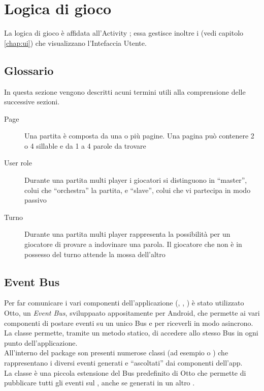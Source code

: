 


\section{Logica di gioco}

\label{chap:game_logic}

La logica di gioco è affidata all'Activity ; essa gestisce inoltre i  (vedi capitolo \ref{chap:ui}) che visualizzano l'Intefaccia Utente.

\subsection{Glossario}
\label{sec:glossary}
In questa sezione vengono descritti acuni termini utili alla comprensione delle successive sezioni.

\begin{description}
\item[Page] Una partita è composta da una o più pagine. Una pagina può contenere 2 o 4 sillable e da 1 a 4 parole da trovare
\item[User role] Durante una partita multi player i giocatori si distinguono in ``master'', colui che ``orchestra'' la partita, e ``slave'', colui che vi partecipa in modo passivo 
\item[Turno] Durante una partita multi player rappresenta la possibilità per un giocatore di provare a indovinare una parola. Il giocatore che non è in possesso del turno attende la mossa dell'altro
\end{description}

\subsection{Event Bus}
\label{sec:event_bus}
Per far comunicare i vari componenti dell'applicazione (, , ) è stato utilizzato Otto, un \textit{Event Bus}, sviluppaato appositamente per Android, che permette ai vari componenti di postare eventi su un unico Bus e per riceverli in modo asincrono.\\
La classe  permette, tramite un metodo statico, di accedere allo stesso Bus in ogni punto dell'applicazione.\\
All'interno del package  son presenti numerose classi (ad esempio  o ) che rappresentano i diversi eventi generati e ``ascoltati'' dai componenti dell'app.\\
La classe  è una piccola estensione del Bus predefinito di Otto che permette di pubblicare tutti gli eventi sul , anche se generati in un altro .

